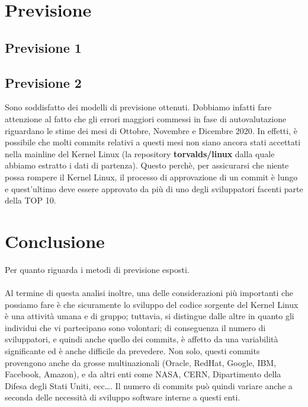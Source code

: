 \documentclass[11pt,a4paper]{article}
\begin{document}
\section{Previsione}
\subsection{Previsione 1}	%
\subsection{Previsione 2}	%
Sono soddisfatto dei modelli di previsione ottenuti. Dobbiamo infatti fare
attenzione al fatto che gli errori maggiori commessi in fase di autovalutazione
riguardano le stime dei mesi di Ottobre, Novembre e Dicembre 2020. In effetti,
\`e possibile che molti commits relativi a questi mesi non siano ancora stati
accettati nella mainline del Kernel Linux (la repository \textbf{torvalds/linux}
dalla quale abbiamo estratto i dati di partenza). Questo perch\`e, per
assicurarsi che niente possa rompere il Kernel Linux, il processo di
approvazione di un commit \`e lungo e quest'ultimo deve essere approvato da
pi\`u di uno degli sviluppatori facenti parte della TOP 10.

\section{Conclusione}
Per quanto riguarda i metodi di previsione esposti.\\
\\
Al termine di questa analisi inoltre, una delle considerazioni pi\`u importanti
che possiamo fare \`e che sicuramente lo sviluppo del codice sorgente del
Kernel Linux \`e una attivit\`a umana e di gruppo; tuttavia, si distingue dalle
altre in quanto gli individui che vi partecipano sono volontari; di conseguenza
il numero di sviluppatori, e quindi anche quello dei commits, \`e affetto da una
variabilit\`a significante ed \`e anche difficile da prevedere. Non solo, questi
commits provengono anche da grosse multinazionali (Oracle, RedHat, Google, IBM,
Facebook, Amazon), e da altri enti come NASA, CERN, Dipartimento della Difesa
degli Stati Uniti, ecc\dots. Il numero di commits pu\`o quindi variare anche a
seconda delle necessit\`a di sviluppo software interne a questi enti.
\end{document}
